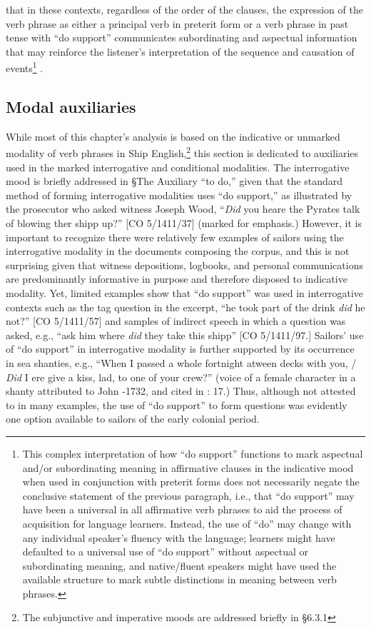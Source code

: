 that in these contexts, regardless of the order of the clauses, the expression of the verb phrase as either a principal verb in preterit form or a verb phrase in past tense with “do support” communicates subordinating and aspectual information that may reinforce the listener’s interpretation of the sequence and causation of events\footnote{This complex interpretation of how “do support” functions to mark aspectual and/or subordinating meaning in affirmative clauses in the indicative mood when used in conjunction with preterit forms does not necessarily negate the conclusive statement of the previous paragraph, i.e., that “do support” may have been a universal in all affirmative verb phrases to aid the process of acquisition for language learners. Instead, the use of “do” may change with any individual speaker’s fluency with the language; learners might have defaulted to a universal use of “do support” without aspectual or subordinating meaning, and native/fluent speakers might have used the available structure to mark subtle distinctions in meaning between verb phrases.} .  

\subsection{\textbf{Modal} \textbf{auxiliaries}}%

  While most of this chapter’s analysis is based on the indicative or unmarked modality of verb phrases in Ship English,\footnote{The subjunctive and imperative moods are addressed briefly in §6.3.1} this section is dedicated to auxiliaries used in the marked interrogative and conditional modalities. The interrogative mood is briefly addressed in §The Auxiliary “to do,” given that the standard method of forming interrogative modalities uses “do support,” as illustrated by the prosecutor who asked witness Joseph Wood, “\textit{Did} you heare the Pyrates talk of blowing ther shipp up?” [CO 5/1411/37] (marked for emphasis.) However, it is important to recognize there were relatively few examples of sailors using the interrogative modality in the documents composing the corpus, and this is not surprising given that witness depositions, logbooks, and personal communications are predominantly informative in purpose and therefore disposed to indicative modality. Yet, limited examples show that “do support” was used in interrogative contexts such as the tag question in the excerpt, “he took part of the drink \textit{did} he not?” [CO 5/1411/57] and samples of indirect speech in which a question was asked, e.g., “ask him where \textit{did} they take this shipp” [CO 5/1411/97.] Sailors’ use of “do support” in interrogative modality is further supported by its occurrence in sea shanties, e.g., “When I passed a whole fortnight atween decks with you, / \textit{Did} I ere give a kiss, lad, to one of your crew?” (voice of a female character in a shanty attributed to John \citealt{Gay1685}-1732, and cited in \citealt{Hugill1969}: 17.) Thus, although not attested to in many examples, the use of “do support” to form questions was evidently one option available to sailors of the early colonial period.   

